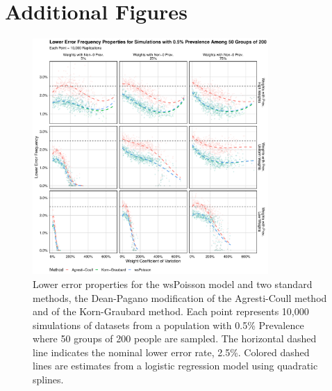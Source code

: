 \documentclass[AMA,STIX1COL]{WileyNJD-v2}
\begin{document}
\section{Additional Figures}

\begin{figure}
\centering
\includegraphics[width=0.8\textwidth]{figures/perfect_lower_error_frequency_50_groups_0_005_prev.pdf}
\caption{Lower error properties for the wsPoisson model and two standard methods, the Dean-Pagano modification of the Agresti-Coull method and of the Korn-Graubard method.
Each point represents 10,000 simulations of datasets from a population with 0.5\% Prevalence where 50 groups of 200 people are sampled.
The horizontal dashed line indicates the nominal lower error rate, 2.5\%.
Colored dashed lines are estimates from a logistic regression model using quadratic splines.}
\label{fig:perfect_lower_error_frequency_50_groups_0_005_prev}
\end{figure}
\end{document}
